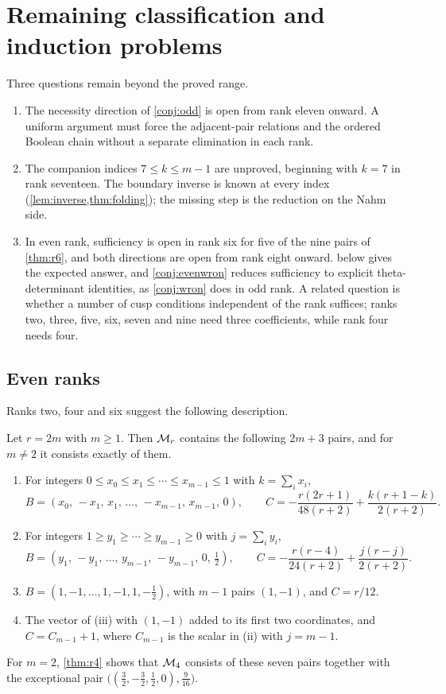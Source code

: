 \section{Remaining classification and induction problems}\label{sec:open}

Three questions remain beyond the proved range.
\begin{enumerate}
\item The necessity direction of \cref{conj:odd} is open from rank eleven onward. A uniform argument must force the adjacent-pair relations and the ordered Boolean chain without a separate elimination in each rank.
\item The companion indices $7\le k\le m-1$ are unproved, beginning with $k=7$ in rank seventeen. The boundary inverse is known at every index (\cref{lem:inverse,thm:folding}); the missing step is the reduction on the Nahm side.
\item In even rank, sufficiency is open in rank six for five of the nine pairs of \cref{thm:r6}, and both directions are open from rank eight onward.  below gives the expected answer, and \cref{conj:evenwron} reduces sufficiency to explicit theta-determinant identities, as \cref{conj:wron} does in odd rank. A related question is whether a number of cusp conditions independent of the rank suffices; ranks two, three, five, six, seven and nine need three coefficients, while rank four needs four.
\end{enumerate}

\subsection{Even ranks}
Ranks two, four and six suggest the following description.

\begin{conjecture}\label{conj:even}
Let $r=2m$ with $m\ge1$. Then $\mathcal{M}_r$ contains the following $2m+3$ pairs, and for $m\ne2$ it consists exactly of them.
\begin{enumerate}
\item For integers $0\le x_0\le x_1\le\cdots\le x_{m-1}\le1$ with $k=\sum_ix_i$,
\[
B=(x_0,\,-x_1,\,x_1,\,\dots,\,-x_{m-1},\,x_{m-1},\,0),\qquad C=-\frac{r(2r+1)}{48(r+2)}+\frac{k(r+1-k)}{2(r+2)}.
\]
\item For integers $1\ge y_1\ge\cdots\ge y_{m-1}\ge0$ with $j=\sum_iy_i$,
\[
B=(y_1,\,-y_1,\,\dots,\,y_{m-1},\,-y_{m-1},\,0,\,\tfrac12),\qquad C=-\frac{r(r-4)}{24(r+2)}+\frac{j(r-j)}{2(r+2)}.
\]
\item $B=(1,-1,\dots,1,-1,1,-\tfrac12)$, with $m-1$ pairs $(1,-1)$, and $C=r/12$.
\item The vector of (iii) with $(1,-1)$ added to its first two coordinates, and $C=C_{m-1}+1$, where $C_{m-1}$ is the scalar in (ii) with $j=m-1$.
\end{enumerate}
For $m=2$, \cref{thm:r4} shows that $\mathcal{M}_4$ consists of these seven pairs together with the exceptional pair $\bigl((\frac32,-\frac32,\frac12,0),\frac9{16}\bigr)$.
\end{conjecture}


